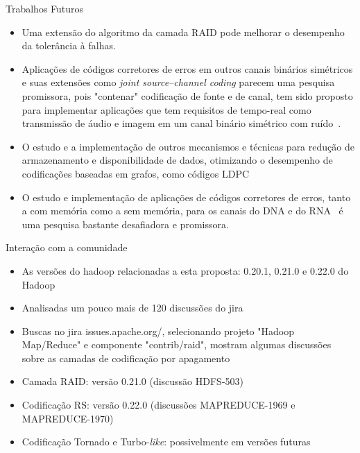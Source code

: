 \begin{frame}{Trabalhos Futuros}
   \begin{itemize}

        \item<1-> Uma extensão do algoritmo da camada RAID pode melhorar o desempenho da tolerância à falhas.

        \item<2-> Aplicações de códigos corretores de erros em outros canais binários simétricos e suas extensões como \emph{joint source–channel coding} parecem uma pesquisa promissora, pois "contenar" codificação de fonte e de canal, tem sido proposto para implementar aplicações que tem requisitos de tempo-real como transmissão de áudio e imagem em um canal binário simétrico com ruído~\cite{JSCC:2012}.

        \item<3-> O estudo e a implementação de outros mecanismos e técnicas para redução de armazenamento e disponibilidade de dados, otimizando o desempenho de codificações baseadas em grafos, como códigos LDPC

        \item<4-> O estudo e implementação de aplicações de códigos corretores de erros, tanto a com memória como a sem memória, para os canais do DNA e do RNA~\cite{Rocha:2010,Faria:2012} é uma pesquisa bastante desafiadora e promissora.

  \end{itemize}

\end{frame}

 \begin{frame}{Interação com a comunidade}
   \begin{itemize}
      \item<1-> As versões do hadoop relacionadas a esta proposta: 0.20.1, 0.21.0 e 0.22.0 do Hadoop
      \item<2-> Analisadas um pouco mais de 120 discussões do jira
      \item<3-> Buscas no jira issues.apache.org/, selecionando projeto "Hadoop Map/Reduce" e componente "contrib/raid", mostram algumas discussões sobre as camadas de codificação por apagamento
      \item<4-> Camada RAID: versão 0.21.0 (discussão HDFS-503)
      \item<5-> Codificação RS: versão 0.22.0 (discussões MAPREDUCE-1969 e MAPREDUCE-1970)
      \item<6-> Codificação Tornado e Turbo-\emph{like}: possivelmente em versões futuras
   \end{itemize}
 \end{frame}

